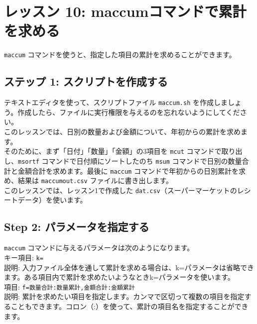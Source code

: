 

%

\section{レッスン 10: maccumコマンドで累計を求める}

\verb|maccum| コマンドを使うと、指定した項目の累計を求めることができます。

\subsection{ステップ 1: スクリプトを作成する}

テキストエディタを使って、スクリプトファイル \verb|maccum.sh| を作成しましょう。作成したら、ファイルに実行権限を与えるのを忘れないようにしてください。\\

このレッスンでは、日別の数量および金額について、年初からの累計を求めます。\\

そのために、まず「日付」「数量」「金額」の3項目を \verb|mcut| コマンドで取り出し、\verb|msortf| コマンドで日付順にソートしたのち \verb|msum| コマンドで日別の数量合計と金額合計を求めます。最後に \verb|maccum| コマンドで年初からの日別累計を求め、結果は \verb|maccumout.csv| ファイルに書き出します。\\

このレッスンでは、レッスン1で作成した \verb|dat.csv|（スーパーマーケットのレシートデータ）を使います。

 \subsection{Step 2: パラメータを指定する}

{\setlength{\parindent}{0cm}

\verb|maccum| コマンドに与えるパラメータは次のようになります。\\

キー項目: 			\verb|k=| \\
説明: 入力ファイル全体を通して累計を求める場合は、k=パラメータは省略できます。ある項目内で累計を求めたいようなときk=パラメータを使います。\\

項目: \verb|f=数量合計:数量累計,金額合計:金額累計| \\
説明: 累計を求めたい項目を指定します。カンマで区切って複数の項目を指定することもできます。コロン（:）を使って、累計の項目名を指定することができます。\\
}

